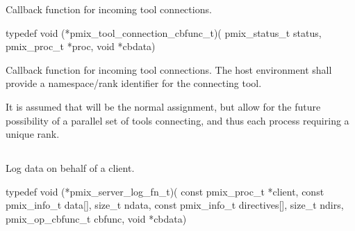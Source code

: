 \summary

Callback function for incoming tool connections.

\format

\cspecificstart
\begin{codepar}
typedef void (*pmix_tool_connection_cbfunc_t)(
                             pmix_status_t status,
                             pmix_proc_t *proc, void *cbdata)
\end{codepar}
\cspecificend

\begin{arglist}
\end{arglist}

\descr

Callback function for incoming tool connections.
The host environment shall provide a namespace/rank identifier for the connecting tool.

\advicermstart
It is assumed that  will be the normal assignment, but allow for the future possibility of a parallel set of tools connecting, and thus each process requiring a unique rank.
\advicermend


\subsection{}

\summary

Log data on behalf of a client.

\format

\cspecificstart
\begin{codepar}
typedef void (*pmix_server_log_fn_t)(
                             const pmix_proc_t *client,
                             const pmix_info_t data[], size_t ndata,
                             const pmix_info_t directives[], size_t ndirs,
                             pmix_op_cbfunc_t cbfunc, void *cbdata)
\end{codepar}
\cspecificend

\begin{arglist}
\end{arglist}


